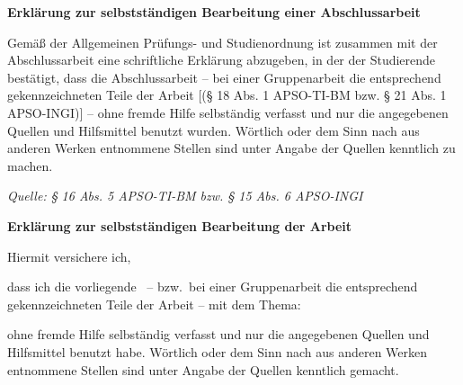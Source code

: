 \clearpage
\thispagestyle{plain}
\ITocEntryStatement
\textbf{\sffamily\large Erklärung zur selbstständigen Bearbeitung einer Abschlussarbeit}

{\footnotesize
Gemäß der Allgemeinen Prüfungs- und Studienordnung ist zusammen mit der Abschlussarbeit eine schriftliche Erklärung abzugeben, in der der Studierende bestätigt, dass die Abschlussarbeit \glqq– bei einer Gruppenarbeit die entsprechend gekennzeichneten Teile der Arbeit [(§ 18 Abs. 1 APSO-TI-BM bzw. § 21 Abs. 1 APSO-INGI)] – ohne fremde Hilfe selbständig verfasst und nur die angegebenen Quellen und Hilfsmittel benutzt wurden. Wörtlich oder dem Sinn nach aus anderen Werken entnommene Stellen sind unter Angabe der Quellen kenntlich zu machen.\grqq
}

\hfill {\em\footnotesize Quelle: § 16 Abs. 5 APSO-TI-BM bzw. § 15 Abs. 6 APSO-INGI}

\vspace{1cm}
\textbf{\sffamily Erklärung zur selbstständigen Bearbeitung der Arbeit}

Hiermit versichere ich,
\par\noindent{}    \makebox[8cm]{\hrulefill}
\par\noindent{} \makebox[8cm]{\hrulefill}

dass ich die vorliegende \IthesisKindDE\ -- bzw.\ bei einer Gruppenarbeit die entsprechend gekennzeichneten Teile der Arbeit -- mit dem Thema:

\textbf{\IthesisTitle}

ohne fremde Hilfe selbständig verfasst und nur die angegebenen Quellen und Hilfsmittel benutzt habe.
Wörtlich oder dem Sinn nach aus anderen Werken entnommene Stellen sind unter Angabe der Quellen kenntlich gemacht.

\vspace{1cm}
\noindent\makebox[3cm]{\hrulefill} \hspace{0.1cm}
    \makebox[3cm]{\hrulefill} \hspace{0.1cm}
    \makebox[6cm]{\hrulefill} \\
\noindent{} \hspace{0.1cm}
     \hspace{0.1cm}

\clearpage
